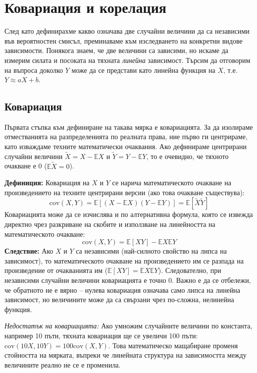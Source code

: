 \documentclass{article}
\begin{document}
\section{Ковариация и корелация}

След като дефинирахме какво означава две случайни величини да са независими във вероятностен смисъл, преминаваме към изследването на конкретни видове зависимости. Понякога знаем, че две величини са зависими, но искаме да измерим силата и посоката на тяхната \textit{линейна} зависимост. Търсим да отговорим на въпроса доколко $Y$ може да се представи като линейна функция на $X$, т.е. $Y \approx aX + b$.

\subsection{Ковариация}

Първата стъпка към дефиниране на такава мярка е ковариацията. За да изолираме отместванията на разпределенията по реалната права, ние първо ги центрираме, като изваждаме техните математически очаквания.
Ако дефинираме центрирани случайни величини $\widetilde{X} = X - \mathbb{E}X$ и $\widetilde{Y} = Y - \mathbb{E}Y$, то е очевидно, че тяхното очакване е 0 ($\mathbb{E}\widetilde{X} = 0$).

\textbf{Дефиниция:} Ковариация на $X$ и $Y$ се нарича математическото очакване на произведението на техните центрирани версии (ако това очакване съществува):
\[
\text{cov}(X, Y) = \mathbb{E}[(X - \mathbb{E}X)(Y - \mathbb{E}Y)] = \mathbb{E}[\widetilde{X}\widetilde{Y}]
\]
Ковариацията може да се изчислява и по алтернативна формула, която се извежда директно чрез разкриване на скобите и използване на линейността на математическото очакване:
\[
\text{cov}(X, Y) = \mathbb{E}[XY] - \mathbb{E}X \mathbb{E}Y
\]
\textbf{Следствие:} Ако $X$ и $Y$ са независими (най-силното свойство на липса на зависимост), то математическото очакване на произведението им се разпада на произведение от очакванията им ($\mathbb{E}[XY] = \mathbb{E}X\mathbb{E}Y$). Следователно, при независими случайни величини ковариацията е точно 0. Важно е да се отбележи, че обратното не е вярно – нулева ковариация означава само липса на линейна зависимост, но величините може да са свързани чрез по-сложна, нелинейна функция.

\textit{Недостатък на ковариацията:} Ако умножим случайните величини по константа, например 10 пъти, тяхната ковариация ще се увеличи 100 пъти: $\text{cov}(10X, 10Y) = 100 \text{cov}(X, Y)$. Това математическо мащабиране променя стойността на мярката, въпреки че линейната структура на зависимостта между величините реално не се е променила.
\end{document}
